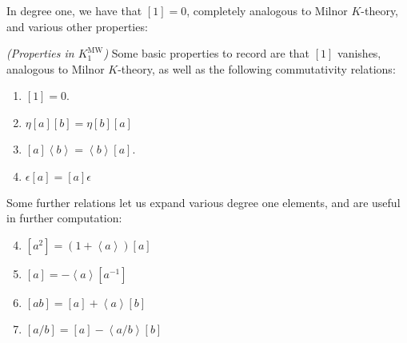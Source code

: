 \documentclass[11pt,openany]{book}
\providecommand{\MW}{\mathrm{MW}}
\begin{document}
In degree one, we have that $[1] = 0$, completely analogous to Milnor $K$-theory, and various other properties:

\begin{proposition}\label{prop:properties-KMW1} \textit{(Properties in $K_1^\MW$)} Some basic properties to record are that $[1]$ vanishes, analogous to Milnor $K$-theory, as well as the following commutativity relations:
\begin{enumerate}
    \item $[1] = 0$.
    \item\label{KMW:square-brackets-commute-eta}
    $\eta[a][b] = \eta[b][a]$
    
    \item\label{KMW:square-angle-brackets-commute}
    $[a] \left\langle b \right\rangle = \left\langle b \right\rangle[a]$.
    \item\label{KMW:square-and-epsilon-commute}
    $\epsilon[a]=[a]\epsilon$
\end{enumerate}
Some further relations let us expand various degree one elements, and are useful in further computation:
\begin{enumerate}
\setcounter{enumi}{3}
    \item\label{KMW:bracket-of-square}
    $[a^2] = (1+ \left\langle a \right\rangle )[a]$
    
    \item\label{KMW:minus-square-bracket} $[a] = -\left\langle a \right\rangle[a^{-1}]$
    \item\label{KMW:bracket-of-product}
    $[ab] = [a] +\left\langle a \right\rangle[b]$
    \item\label{KMW:bracket-of-fraction}
    $[a/b] = [a] - \left\langle a/b \right\rangle[b]$

\end{enumerate}
\end{proposition}
\end{document}
